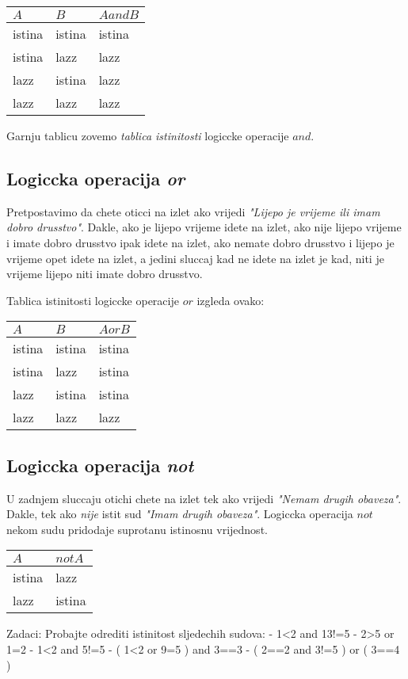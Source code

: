 \begin{tabular}{ll|l}
	$A$ & $B$ & $A and B$ \\
	\hline
	istina & istina & istina \\
	istina & lazz & lazz \\
	lazz & istina & lazz \\
	lazz & lazz & lazz 
\end{tabular}

Garnju tablicu zovemo \emph{tablica istinitosti} logiccke operacije $and$.

\subsection{Logiccka operacija \emph{or}}

Pretpostavimo da chete oticci na izlet ako vrijedi \emph{"Lijepo
je vrijeme ili imam dobro drusstvo"}. Dakle, ako je lijepo vrijeme
idete na izlet, ako nije lijepo vrijeme i imate dobro drusstvo ipak
idete na izlet, ako nemate dobro drusstvo i lijepo je vrijeme opet
idete na izlet, a jedini sluccaj kad ne idete na izlet je kad, niti
je vrijeme lijepo niti imate dobro drusstvo.

Tablica istinitosti logiccke operacije $or$ izgleda ovako:

\begin{tabular}{ll|l}
	$A$ & $B$ & $A or B$ \\
	\hline
	istina & istina & istina \\
	istina & lazz & istina \\
	lazz & istina & istina \\
	lazz & lazz & lazz 
\end{tabular}

\subsection{Logiccka operacija \emph{not}}

U zadnjem sluccaju otichi chete na izlet tek ako vrijedi \emph{"Nemam
drugih obaveza"}. Dakle, tek ako \emph{nije} istit sud \emph{"Imam
drugih obaveza"}. Logiccka operacija $not$ nekom sudu pridodaje
suprotanu istinosnu vrijednost.

\begin{tabular}{l|l}
	$A$ & $not A$ \\
	\hline
	istina & lazz\\
	lazz & istina
\end{tabular}

Zadaci: Probajte odrediti istinitost sljedechih sudova:
	- 1<2 and 13!=5
	- 2>5 or 1=2
	- 1<2 and 5!=5
	- ( 1<2 or 9=5 ) and 3==3
	- ( 2==2 and 3!=5 ) or ( 3==4 )

